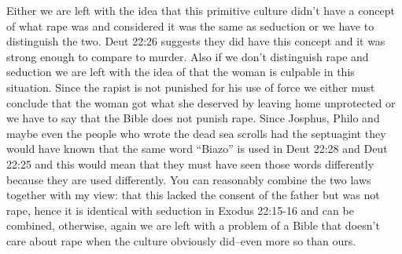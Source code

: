\documentclass[11pt]{article}
\begin{document}
Either we are left with the idea that this primitive culture didn’t have a concept of what rape was and considered it was the same as seduction or we have to distinguish the two. Deut 22:26 suggests they did have this concept and it was strong enough to compare to murder. Also if we don’t distinguish rape and seduction we are left with the idea of that the woman is culpable in this situation. Since the rapist is not punished for his use of force we either must conclude that the woman got what she deserved by leaving home unprotected or we have to say that the Bible does not punish rape. Since Josphus, Philo and maybe even the people who wrote the dead sea scrolls had the septuagint they would have known that the same word “Biazo” is used in Deut 22:28 and Deut 22:25 and this would mean that they must have seen those words differently because they are used differently. You can reasonably combine the two laws together with my view: that this lacked the consent of the father but was not rape, hence it is identical with seduction in Exodus 22:15-16 and can be combined, otherwise, again we are left with a problem of a Bible that doesn’t care about rape when the culture obviously did--even more so than ours.
\end{document}
